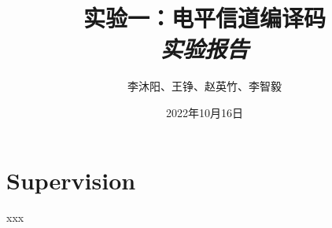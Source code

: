 \documentclass{article}
\title{\textbf{实验一：电平信道编译码}\\
        \Large \emph{实验报告}}
\author{李沐阳、王铮、赵英竹、李智毅}
\date{2022年10月16日}
\begin{document}
\maketitle
\thispagestyle{firstpage}

\section*{Supervision}

xxx



\end{document}
